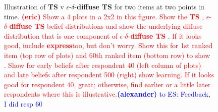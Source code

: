 \documentclass[nonblindrev]{informs3}
\newcommand{\alexander}[1]{\textcolor{blue}{\textbf{(alexander)} #1}}
\newcommand{\eric}[1]{\textcolor{red}{\textbf{(eric)} #1}}
\newcommand{\fixedexpress}{\textbf{express}}
\newcommand{\ts}{\textbf{TS} }
\newcommand{\edts}{$\epsilon$-$\delta$-\textbf{diffuse TS} }
\begin{document}
\begin{figure}
\caption{ Illustration of \ts v \edts for two items at two points in time. \eric{Show a 4 plots in a 2x2 in this figure. Show the \ts, \edts belief distributions and show the underlying diffuse distribution that is one component of \edts. If it looks good, include \fixedexpress too, but don't worry. Show this for 1st ranked item (top row of plots) and 60th ranked item (bottom row) to show . Show for early beliefs after respondent 40 (left column of plots) and late beliefs after respondent 500 (right) show learning. If it looks good for respondent 40, great; otherwise, find earlier or a little later respondents where this is illustrative.}\alexander{to ES: Feedback, I did resp 60} }
\label{fig:illustrating_edts}
 	\begin{center}
    \qquad
    \qquad
    \qquad
    \end{center}
\end{figure}
\end{document}
